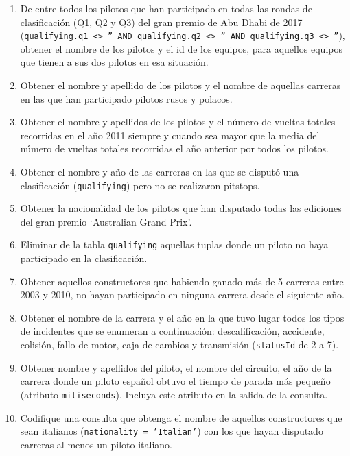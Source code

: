 \documentclass{db-practice}
\begin{document}
\begin{enumerate}
    \item De entre todos los pilotos que han participado en todas las rondas de clasificación (Q1, Q2 y Q3) del gran premio de Abu Dhabi de 2017 (\texttt{qualifying.q1 <> '' AND qualifying.q2 <> '' AND qualifying.q3 <> ''}), obtener el nombre de los pilotos y el id de los equipos, para aquellos equipos que tienen a sus dos pilotos en esa situación.
    
    \item Obtener el nombre y apellido de los pilotos y el nombre de aquellas carreras en las que han participado pilotos rusos y polacos.
            
    \item Obtener el nombre y apellidos de los pilotos y el número de vueltas totales recorridas en el año 2011 siempre y cuando sea mayor que la media del número de vueltas totales recorridas el año anterior por todos los pilotos.

    \item Obtener el nombre y año de las carreras en las que se disputó una clasificación (\texttt{qualifying}) pero no se realizaron pitstops.
    
    \item Obtener la nacionalidad de los pilotos que han disputado todas las ediciones del gran premio `Australian Grand Prix'.
    
    \item Eliminar de la tabla \texttt{qualifying} aquellas tuplas donde un piloto no haya participado en la clasificación.
            
    \item Obtener aquellos constructores que habiendo ganado más de 5 carreras entre 2003 y 2010, no hayan participado en ninguna carrera desde el siguiente año.
    
    \item Obtener el nombre de la carrera y el año en la que tuvo lugar todos los tipos de incidentes que se enumeran a continuación: descalificación, accidente, colisión, fallo de motor, caja de cambios y transmisión (\texttt{statusId} de 2 a 7).
    
    \item Obtener nombre y apellidos del piloto, el nombre del circuito, el año de la carrera donde un piloto español obtuvo el tiempo de parada más pequeño (atributo \texttt{miliseconds}). Incluya este atributo en la salida de la consulta.

    \item Codifique una consulta que obtenga el nombre de aquellos constructores que sean italianos (\texttt{nationality = 'Italian'}) con los que hayan disputado carreras al menos un piloto italiano.
            

\end{enumerate}
\end{document}
